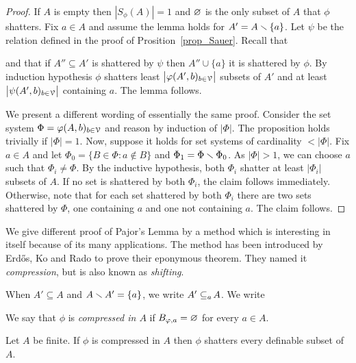 \documentclass[sputnik.tex]{subfiles}
\begin{document}
\begin{proof}
If $A$ is empty then $|S_\phi(A)|=1$ and $\varnothing$ is the only subset of $A$ that $\phi$ shatters.
Fix $a\in A$ and assume the lemma holds for $A'=A\smallsetminus\{a\}$.
Let $\psi$ be the relation defined in the proof of Prosition~\ref{prop_Sauer}.
Recall that


and that if $A''\subseteq A'$ is shattered by $\psi$ then $A''\cup\{a\}$ it is shattered by $\phi$.
By induction hypothesis $\phi$ shatters least $\big|\varphi(A',b)_{b\in\EuScript V}\big|$ subsets of $A'$ and at least $\big|\psi(A',b)_{b\in\EuScript V}\big|$ containing $a$.
The lemma follows.

We present a different wording of essentially the same proof.
Consider the set system $\Phi=\varphi(A,b)_{b\in\EuScript V}$ and reason by induction of $|\Phi|$.
The proposition holds trivially if $|\Phi|=1$.
Now, suppose it holds for set systems of cardinality $<|\Phi|$.
Fix $a\in A$ and let $\Phi_0=\big\{B\in\Phi : a\notin B\big\}$ and $\Phi_1=\Phi\smallsetminus\Phi_0$.
As $|\Phi|>1$, we can choose $a$ such that $\Phi_i\neq\Phi$.
By the inductive hypothesis, both $\Phi_i$ shatter at least $\big|\Phi_i\big|$ subsets of $A$.
If no set is shattered by both $\Phi_i$, the claim follows immediately.
Otherwise, note that for each set shattered by both $\Phi_i$ there are two sets shattered by $\Phi$, one containing $a$ and one not containing $a$.
The claim follows.
\end{proof}
 
We give different proof of Pajor's Lemma by a method which is interesting in itself because of its many applications.
The method has been introduced by Erd\H{o}s, Ko and Rado to prove their eponymous theorem.
They named it \textit{compression}, but is also known as \textit{shifting}.


When $A'\subseteq A$ and $A\smallsetminus A'=\{a\}$, we write \emph{$A'\subseteq_{a}\kern-1.5pt A$}. We write


We say that $\phi$ is \emph{compressed in $A$\/} if $B_{\varphi,a}=\varnothing$ for every $a\in A$.

\begin{proposition}\label{prop_compressed} 
Let $A$ be finite. If $\phi$ is compressed in $A$ then $\phi$ shatters every definable subset of $A$.
\end{proposition}
\end{document}
